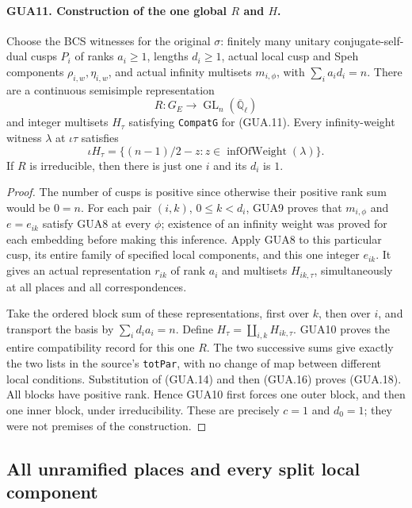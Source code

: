 \paragraph{GUA11. Construction of the one global $R$ and $H$.}
\label{claim:GUA11}
Choose the BCS witnesses for the original $\sigma$:
finitely many unitary conjugate-self-dual cusps $P_i$
of ranks $a_i\geq1$, lengths $d_i\geq1$, actual
local cusp and Speh components $\rho_{i,w},\eta_{i,w}$,
and actual infinity multisets $m_{i,\phi}$, with
$\sum_i a_i d_i=n$.  There are a continuous semisimple
representation
\[
           R:G_E\longrightarrow\operatorname{GL}_n(
                                  \overline{\mathbb Q}_\ell)
\]
and integer multisets $H_\tau$ satisfying
\texttt{CompatG} for (GUA.11).  Every infinity-weight
witness $\lambda$ at $\iota\tau$ satisfies
\[
 \iota H_\tau
       =\{(n-1)/2-z:z\in\operatorname{infOfWeight}(\lambda)\}.
                                                        \tag{GUA.18}
\]
If $R$ is irreducible, then there is just one $i$ and
its $d_i$ is $1$.
\begin{proof}
The number of cusps is positive since otherwise their
positive rank sum would be $0=n$.  For each pair $(i,k)$,
$0\leq k<d_i$, GUA9 proves that $m_{i,\phi}$ and
$e=e_{ik}$ satisfy GUA8 at every $\phi$; existence
of an infinity weight was proved for each embedding
before making this inference.  Apply GUA8 to this
particular cusp, its entire family of specified local
components, and this one integer $e_{ik}$.  It gives
an actual representation $r_{ik}$ of rank $a_i$ and
multisets $H_{ik,\tau}$, simultaneously at all places
and all correspondences.

Take the ordered block sum of these representations,
first over $k$, then over $i$, and transport the basis
by $\sum_i d_i a_i=n$.  Define
$H_\tau=\coprod_{i,k}H_{ik,\tau}$.  GUA10 proves
the entire compatibility record for this one $R$.
The two successive sums give exactly the two lists in
the source's \texttt{totPar}, with no change of map
between different local conditions.  Substitution of
(GUA.14) and then (GUA.16) proves (GUA.18).
All blocks have positive rank.  Hence GUA10 first
forces one outer block, and then one inner block,
under irreducibility.  These are precisely $c=1$
and $d_0=1$; they were not premises of the construction.
\end{proof}

\subsection{All unramified places and every split local component}

